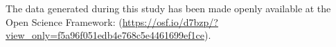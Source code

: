 The data generated during this study has been made openly available at the Open Science Framework: (\url{https://osf.io/d7bzp/?view_only=f5a96f051edb4e768c5e4461699ef1ce}).